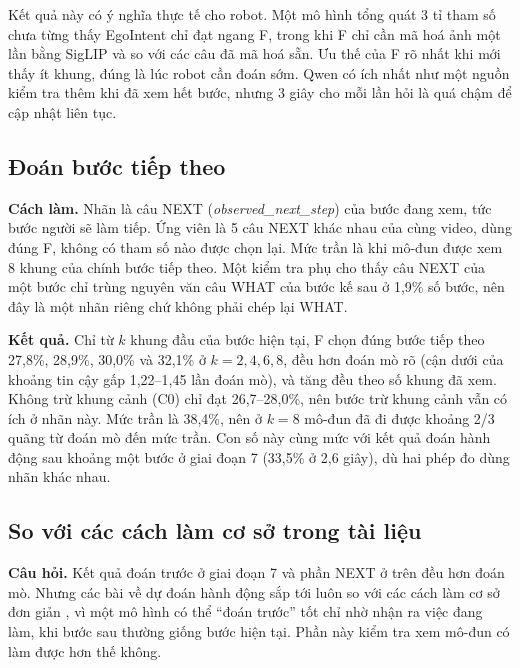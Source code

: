 \documentclass[a4paper,oneside]{report}
\begin{document}
Kết quả này có ý nghĩa thực tế cho robot. Một mô hình tổng quát 3 tỉ tham số chưa từng thấy EgoIntent chỉ đạt ngang F, trong khi F chỉ cần mã hoá ảnh một lần bằng SigLIP và so với các câu đã mã hoá sẵn. Ưu thế của F rõ nhất khi mới thấy ít khung, đúng là lúc robot cần đoán sớm. Qwen có ích nhất như một nguồn kiểm tra thêm khi đã xem hết bước, nhưng 3 giây cho mỗi lần hỏi là quá chậm để cập nhật liên tục.

\subsection{Đoán bước tiếp theo}

\textbf{Cách làm.} Nhãn là câu NEXT (\textit{observed\_next\_step}) của bước đang xem, tức bước người sẽ làm tiếp. Ứng viên là 5 câu NEXT khác nhau của cùng video, dùng đúng F, không có tham số nào được chọn lại. Mức trần là khi mô-đun được xem 8 khung của chính bước tiếp theo. Một kiểm tra phụ cho thấy câu NEXT của một bước chỉ trùng nguyên văn câu WHAT của bước kế sau ở 1,9\% số bước, nên đây là một nhãn riêng chứ không phải chép lại WHAT.

\textbf{Kết quả.} Chỉ từ $k$ khung đầu của bước hiện tại, F chọn đúng bước tiếp theo 27,8\%, 28,9\%, 30,0\% và 32,1\% ở $k=2,4,6,8$, đều hơn đoán mò rõ (cận dưới của khoảng tin cậy gấp 1,22--1,45 lần đoán mò), và tăng đều theo số khung đã xem. Không trừ khung cảnh (C0) chỉ đạt 26,7--28,0\%, nên bước trừ khung cảnh vẫn có ích ở nhãn này. Mức trần là 38,4\%, nên ở $k=8$ mô-đun đã đi được khoảng 2/3 quãng từ đoán mò đến mức trần. Con số này cùng mức với kết quả đoán hành động sau khoảng một bước ở giai đoạn 7 (33,5\% ở 2,6 giây), dù hai phép đo dùng nhãn khác nhau.

\subsection{So với các cách làm cơ sở trong tài liệu}
\label{sec:baselines}

\textbf{Câu hỏi.} Kết quả đoán trước ở giai đoạn 7 và phần NEXT ở trên đều hơn đoán mò. Nhưng các bài về dự đoán hành động sắp tới luôn so với các cách làm cơ sở đơn giản \citep{damen2018epic,furnari2021rulstm}, vì một mô hình có thể ``đoán trước'' tốt chỉ nhờ nhận ra việc đang làm, khi bước sau thường giống bước hiện tại. Phần này kiểm tra xem mô-đun có làm được hơn thế không.
\end{document}
